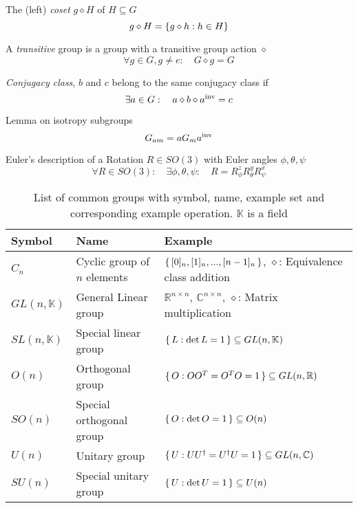 			\noindent
			The (left) \emph{coset} $g \diamond H$ of $H \subseteq G$
			\begin{equation}
				g \diamond H = \qty{g\diamond h: h\in H} 
			\end{equation}

			\noindent
			A \emph{transitive} group is a group with a transitive group action $\diamond$
			\begin{equation}
				\forall g \in G, g \ne e: \quad G \diamond g = G
			\end{equation}

			\noindent
			\emph{Conjugacy class}, $b$ and $c$ belong to the same conjugacy class if
			\begin{equation}
				\exists a \in G: \quad a \diamond b \diamond {a}^\mathrm{inv} = c
			\end{equation}

			\noindent
			Lemma on isotropy subgroups
			\begin{equation}
				G_{a m} = a G_{m} {a}^\mathrm{inv}
			\end{equation}
			
			\noindent
			Euler's description of a Rotation $R\in SO(3)$ with Euler angles $\phi, \theta, \psi$
			\begin{equation}
				\forall R \in SO(3):\quad \exists \phi, \theta, \psi:\quad R = R_\phi^z R_\theta^y R_\psi^x
			\end{equation}
			
			\begin{table}[ht]
				\begin{center}
				\begin{tabular}{ l | l | l }
					Symbol & Name & Example \\ \hline
					$C_n$ & Cyclic group of $n$ elements & $\set{[0]_n, [1]_n, ..., [n-1]_n}$, $\diamond$: Equivalence class addition \\
					$GL(n, \mathbb{K})$ & General Linear group & $\mathbb{R}^{n\times n}$, $\mathbb{C}^{n\times n}$, $\diamond$: Matrix multiplication \\
					$SL(n, \mathbb{K})$ & Special linear group & $\set{L: \det L = 1} \subseteq GL(n, \mathbb{K})$ \\
					$O(n)$ & Orthogonal group & $\set{O: OO^{T}=O^{T}O=1}\subseteq GL(n, \mathbb{R})$ \\
					$SO(n)$ & Special orthogonal group& $\set{O: \det O = 1}\subseteq O(n)$\\
					$U(n)$ & Unitary group & $\set{U: UU^{\dagger}=U^{\dagger}U=1}\subseteq GL(n, \mathbb{C})$ \\
					$SU(n)$ & Special unitary group & $\set{U: \det U = 1}\subseteq U(n)$ \\
					\end{tabular}
					\caption{List of common groups with symbol, name, example set and corresponding example operation. $\mathbb{K}$ is a field}
				\end{center}
			\end{table} \vsp


